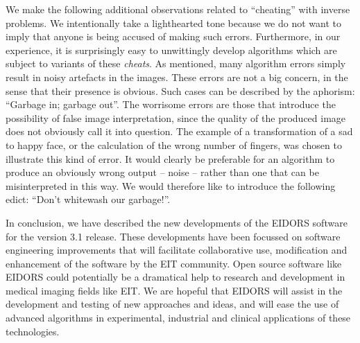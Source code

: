\documentclass[12pt]{iopart}
\begin{document}
We make the following additional observations related to 
``cheating'' with inverse problems.
We intentionally take a
lighthearted tone because we do not want to
imply that anyone is being accused of making such errors.
Furthermore, in our experience, it 
is surprisingly easy to unwittingly develop
algorithms which are subject to variants of these {\em cheats}.
As mentioned, many algorithm errors simply result in 
noisy artefacts in the images. These errors are not a big
concern, in the sense that their presence is obvious.
Such cases can be described by the aphorism:
``Garbage in; garbage out''.
The worrisome errors are those that introduce the possibility
of false image interpretation, since the quality of the
produced image does not obviously call it into question.
The example of a transformation of a sad to happy face,
or the calculation of the wrong number of fingers, 
was chosen to illustrate this kind of error. It would
clearly be preferable for an algorithm to produce an
obviously wrong output -- noise -- rather than one
that can be misinterpreted in this way. We would therefore like
to introduce the following edict: 
``Don't whitewash our garbage!''.


In conclusion, we have described the new
developments of the EIDORS software for the
version 3.1 release. These developments have been 
focussed on software engineering improvements that
will facilitate collaborative use, modification and
enhancement of the software by the EIT community.
Open source software like EIDORS could
potentially be a dramatical help to
research and development in medical imaging fields like EIT.
We are hopeful that EIDORS will assist in the development
and testing of new approaches and ideas, and will
ease the use of advanced algorithms in experimental,
industrial and clinical applications of these technologies.
\end{document}
